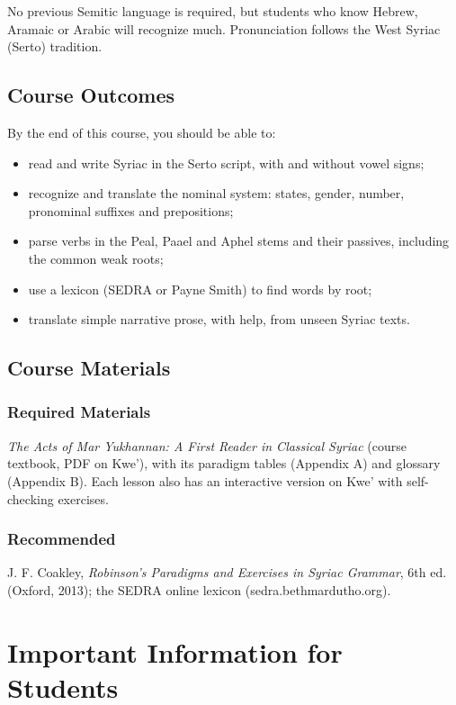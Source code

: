 \documentclass[12pt]{article}
\begin{document}
No previous Semitic language is required, but students who know Hebrew, Aramaic or Arabic will recognize much. Pronunciation follows the West Syriac (Serto) tradition.

\subsection*{Course Outcomes}

By the end of this course, you should be able to:
\begin{itemize}
  \item read and write Syriac in the Serto script, with and without vowel signs;
  \item recognize and translate the nominal system: states, gender, number, pronominal suffixes and prepositions;
  \item parse verbs in the Peal, Paael and Aphel stems and their passives, including the common weak roots;
  \item use a lexicon (SEDRA or Payne Smith) to find words by root;
  \item translate simple narrative prose, with help, from unseen Syriac texts.
\end{itemize}

\subsection*{Course Materials}

\subsubsection*{Required Materials}

\emph{The Acts of Mar Yukhannan: A First Reader in Classical Syriac} (course textbook, PDF on Kwe'), with its paradigm tables (Appendix A) and glossary (Appendix B). Each lesson also has an interactive version on Kwe' with self-checking exercises.

\subsubsection*{Recommended}

J. F. Coakley, \emph{Robinson's Paradigms and Exercises in Syriac Grammar}, 6th ed. (Oxford, 2013); the SEDRA online lexicon (sedra.bethmardutho.org).

\section*{Important Information for Students}
\end{document}
